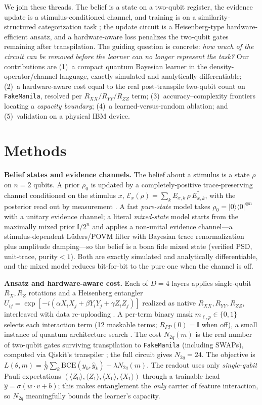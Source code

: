 \documentclass[10pt,conference]{IEEEtran}
\begin{document}
We join these threads. The belief is a state on a two-qubit register, the evidence update is a
stimulus-conditioned channel, and training is on a similarity-structured categorization task
\cite{b19}; the update circuit is a Heisenberg-type hardware-efficient ansatz, and a
hardware-aware loss penalizes the two-qubit gates remaining after transpilation. The guiding
question is concrete: \emph{how much of the circuit can be removed before the learner can no
longer represent the task?} Our contributions are (1)~a compact quantum Bayesian learner in the
density-operator/channel language, exactly simulated and analytically differentiable; (2)~a
hardware-aware cost equal to the real post-transpile two-qubit count on \texttt{FakeManila},
resolved per $R_{XX}/R_{YY}/R_{ZZ}$ term; (3)~accuracy--complexity frontiers locating a
\emph{capacity boundary}; (4)~a learned-versus-random ablation; and (5)~validation on a physical
IBM device.

\section{Methods}
\textbf{Belief states and evidence channels.} The belief about a stimulus is a state $\rho$ on
$n{=}2$ qubits. A prior $\rho_0$ is updated by a completely-positive trace-preserving channel
conditioned on the stimulus $x$,
$\mathcal{E}_x(\rho)=\sum_k E_{x,k}\,\rho\,E_{x,k}^{\dagger}$, with the posterior read out by
measurement \cite{b3}. A fast \emph{pure-state} model takes
$\rho_0=\lvert0\rangle\!\langle0\rvert^{\otimes n}$ with a unitary evidence channel; a literal
\emph{mixed-state} model starts from the maximally mixed prior $\mathbb{I}/2^n$ and applies a
non-unital evidence channel---a stimulus-dependent L\"uders/POVM filter with Bayesian trace
renormalization plus amplitude damping---so the belief is a bona fide mixed state (verified PSD,
unit-trace, purity${<}1$). Both are exactly simulated and analytically differentiable, and the
mixed model reduces bit-for-bit to the pure one when the channel is off.

\textbf{Ansatz and hardware-aware cost.} Each of $D{=}4$ layers applies single-qubit $R_X,R_Z$
rotations and a Heisenberg entangler
$U_{ij}=\exp[-i(\alpha X_iX_j+\beta Y_iY_j+\gamma Z_iZ_j)]$ realized as native
$R_{XX},R_{YY},R_{ZZ}$, interleaved with data re-uploading \cite{b4,b5}. A per-term binary mask
$m_{\ell,p}\in\{0,1\}$ selects each interaction term (12 maskable terms; $R_{PP}(0)=\mathbb{I}$
when off), a small instance of quantum architecture search \cite{b16}. The cost $N_{2q}(m)$ is
the real number of two-qubit gates surviving transpilation to \texttt{FakeManila} (including
SWAPs), computed via Qiskit's transpiler \cite{b24}; the full circuit gives $N_{2q}{=}24$. The
objective is $L(\theta,m)=\frac1N\sum_k \mathrm{BCE}(y_k,\hat y_k)+\lambda N_{2q}(m)$. The
readout uses only \emph{single-qubit} Pauli expectations
$(\langle Z_0\rangle,\langle Z_1\rangle,\langle X_0\rangle,\langle X_1\rangle)$ through a
trainable head $\hat y=\sigma(w\cdot v+b)$; this makes entanglement the \emph{only} carrier of
feature interaction, so $N_{2q}$ meaningfully bounds the learner's capacity.
\end{document}

